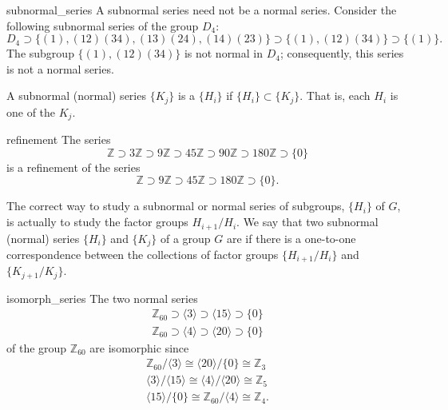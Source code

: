  
\begin{example}{subnormal_series}
A subnormal series need not be a normal series.  Consider the
following subnormal series of the group $D_4$: 
\[
D_4 \supset \{ (1),
(12)(34), (13)(24), (14)(23) \} \supset  \{  (1), (12)(34) \} 
\supset \{ (1) \}.
\]
The subgroup $\{  (1), (12)(34) \}$ is not normal in $D_4$;
consequently, this series is not a normal series.
\end{example}

 
A subnormal (normal) series $\{ K_j \}$ is a  $\{ H_i \}$ if $\{ H_i \} \subset \{ K_j
\}$. That is, each $H_i$ is one of the $K_j$. 
 

\begin{example}{refinement}
The series
\[
{\mathbb Z} \supset 3{\mathbb Z} \supset 9{\mathbb Z} \supset 45{\mathbb Z}
\supset 90{\mathbb Z} \supset 180{\mathbb Z} \supset \{0\}
\]
is a refinement of the series
\[
{\mathbb Z} \supset 9{\mathbb Z} \supset 45{\mathbb Z} \supset 180{\mathbb Z} 
\supset \{0\}.
\]
\end{example}

 
The correct way to study a subnormal or normal series of subgroups,
$\{ H_i \}$ of $G$, is actually to study the factor groups
$H_{i+1}/H_i$.  We say that two subnormal (normal) series $\{H_i \}$
and $\{ K_j \}$ of a group $G$ are  if there is a
one-to-one correspondence between the collections of factor groups
$\{H_{i+1}/H_i \}$ and $\{ K_{j+1}/ K_j \}$. 
 

\begin{example}{isomorph_series}
The two normal series
\begin{gather*}
{\mathbb Z}_{60} \supset \langle 3 \rangle \supset  \langle 15 \rangle
\supset \{ 0 \} \\
{\mathbb Z}_{60} \supset \langle 4 \rangle \supset  \langle 20 \rangle
\supset \{ 0 \}
\end{gather*}
of the group ${\mathbb Z}_{60}$ are isomorphic since
\begin{gather*}
{\mathbb Z}_{60} / \langle 3 \rangle \cong \langle 20 \rangle /
\{ 0 \} \cong {\mathbb Z}_{3}
\\
\langle 3 \rangle / \langle 15 \rangle
\cong \langle 4 \rangle /  \langle 20 \rangle \cong {\mathbb Z}_{5}
\\
\langle 15 \rangle / \{ 0 \} \cong {\mathbb Z}_{60} / \langle 4 \rangle
\cong {\mathbb Z}_4.
\end{gather*}
\end{example}
 

